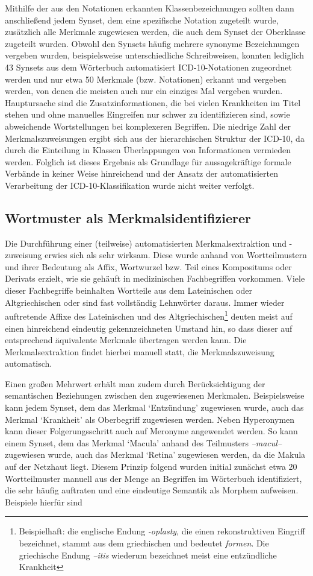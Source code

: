 \documentclass[pagesize,DIV=calc,12pt,draft]{scrreprt}
\begin{document}
Mithilfe der aus den Notationen erkannten Klassenbezeichnungen sollten dann anschließend jedem Synset, dem eine spezifische Notation zugeteilt wurde, zusätzlich alle Merkmale zugewiesen werden, die auch dem Synset der Oberklasse zugeteilt wurden. 
Obwohl den Synsets häufig mehrere synonyme Bezeichnungen vergeben wurden, beispielsweise unterschiedliche Schreibweisen, konnten lediglich 43 Synsets aus dem Wörterbuch automatisiert ICD-10-Notationen zugeordnet werden und nur etwa 50 Merkmale (bzw. Notationen) erkannt und vergeben werden, von denen die meisten auch nur ein einziges Mal vergeben wurden.  
Hauptursache sind die Zusatzinformationen, die bei vielen Krankheiten im Titel stehen und ohne manuelles Eingreifen nur schwer zu identifizieren sind, sowie abweichende Wortstellungen bei komplexeren Begriffen. 
Die niedrige Zahl der Merkmalszuweisungen ergibt sich aus der hierarchischen Struktur der ICD-10, da durch die Einteilung in Klassen Überlappungen von Informationen vermieden werden. 
Folglich ist dieses Ergebnis als Grundlage für aussagekräftige formale Verbände in keiner Weise hinreichend und der Ansatz der automatisierten Verarbeitung der ICD-10-Klassifikation wurde nicht weiter verfolgt. 

\subsection{Wortmuster als Merkmalsidentifizierer}

Die Durchführung einer (teilweise) automatisierten Merkmalsextraktion und -zuweisung erwies sich als sehr wirksam. 
Diese wurde anhand von Wortteilmustern und ihrer Bedeutung als Affix, Wortwurzel bzw. Teil eines Kompositums oder Derivats erzielt, wie sie gehäuft in medizinischen Fachbegriffen vorkommen. 
Viele dieser Fachbegriffe beinhalten Wortteile aus dem Lateinischen oder Altgriechischen oder sind fast vollständig Lehnwörter daraus. 
Immer wieder auftretende Affixe des Lateinischen und des Altgriechischen\footnote{Beispielhaft: die englische Endung \emph{-oplasty}, die einen rekonstruktiven Eingriff bezeichnet, stammt aus dem griechischen und bedeutet \emph{formen}. 
Die griechische Endung \emph{--itis} wiederum bezeichnet meist eine entzündliche Krankheit} deuten meist auf einen hinreichend eindeutig gekennzeichneten Umstand hin, so dass dieser auf entsprechend äquivalente Merkmale übertragen werden kann. 
Die Merkmalsextraktion findet hierbei manuell statt, die Merkmalszuweisung automatisch. 

Einen großen Mehrwert erhält man zudem durch Berücksichtigung der semantischen Beziehungen zwischen den zugewiesenen Merkmalen. 
Beispielsweise kann jedem Synset, dem das Merkmal `Entzündung' zugewiesen wurde, auch das Merkmal `Krankheit' als Oberbegriff zugewiesen werden. 
Neben Hyperonymen kann dieser Folgerungsschritt auch auf Meronyme angewendet werden. 
So kann einem Synset, dem das Merkmal `Macula' anhand des Teilmusters \emph{--macul--} zugewiesen wurde, auch das Merkmal `Retina' zugewiesen werden, da die Makula auf der Netzhaut liegt. 
Diesem Prinzip folgend wurden initial zunächst etwa 20 Wortteilmuster manuell aus der Menge an Begriffen im Wörterbuch identifiziert, die sehr häufig auftraten und eine eindeutige Semantik als Morphem aufweisen. 
Beispiele hierfür sind 
\end{document}
